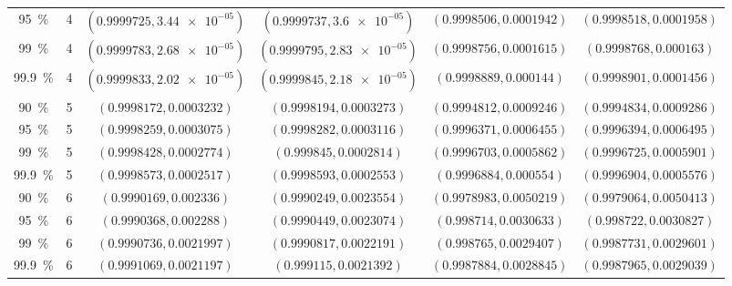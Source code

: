 \begin{table}
\begin{tabular}{cccccc}
\SI{95}{\percent} & 4 & $(0.9999725, \num[scientific-notation=true]{3.44e-05})$ & $(0.9999737, \num[scientific-notation=true]{3.6e-05})$ & $(0.9998506, 0.0001942)$ & $(0.9998518, 0.0001958)$\\
\SI{99}{\percent} & 4 & $(0.9999783, \num[scientific-notation=true]{2.68e-05})$ & $(0.9999795, \num[scientific-notation=true]{2.83e-05})$ & $(0.9998756, 0.0001615)$ & $(0.9998768, 0.000163)$\\
\SI{99.9}{\percent} & 4 & $(0.9999833, \num[scientific-notation=true]{2.02e-05})$ & $(0.9999845, \num[scientific-notation=true]{2.18e-05})$ & $(0.9998889, 0.000144)$ & $(0.9998901, 0.0001456)$\\
\cmidrule(lr){1-6}
\SI{90}{\percent} & 5 & $(0.9998172, 0.0003232)$ & $(0.9998194, 0.0003273)$ & $(0.9994812, 0.0009246)$ & $(0.9994834, 0.0009286)$\\
\SI{95}{\percent} & 5 & $(0.9998259, 0.0003075)$ & $(0.9998282, 0.0003116)$ & $(0.9996371, 0.0006455)$ & $(0.9996394, 0.0006495)$\\
\SI{99}{\percent} & 5 & $(0.9998428, 0.0002774)$ & $(0.999845, 0.0002814)$ & $(0.9996703, 0.0005862)$ & $(0.9996725, 0.0005901)$\\
\SI{99.9}{\percent} & 5 & $(0.9998573, 0.0002517)$ & $(0.9998593, 0.0002553)$ & $(0.9996884, 0.000554)$ & $(0.9996904, 0.0005576)$\\
\cmidrule(lr){1-6}
\SI{90}{\percent} & 6 & $(0.9990169, 0.002336)$ & $(0.9990249, 0.0023554)$ & $(0.9978983, 0.0050219)$ & $(0.9979064, 0.0050413)$\\
\SI{95}{\percent} & 6 & $(0.9990368, 0.002288)$ & $(0.9990449, 0.0023074)$ & $(0.998714, 0.0030633)$ & $(0.998722, 0.0030827)$\\
\SI{99}{\percent} & 6 & $(0.9990736, 0.0021997)$ & $(0.9990817, 0.0022191)$ & $(0.998765, 0.0029407)$ & $(0.9987731, 0.0029601)$\\
\SI{99.9}{\percent} & 6 & $(0.9991069, 0.0021197)$ & $(0.999115, 0.0021392)$ & $(0.9987884, 0.0028845)$ & $(0.9987965, 0.0029039)$\\
\bottomrule
    \end{tabular}
\end{table}


